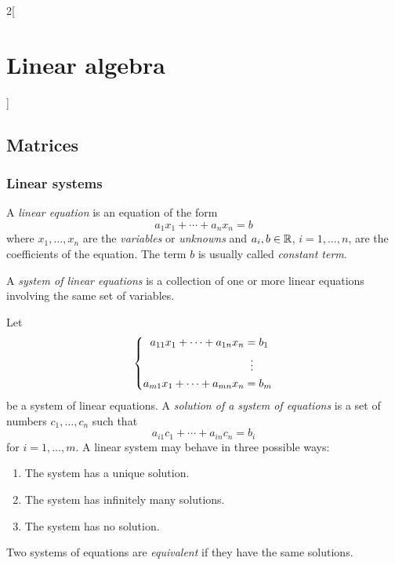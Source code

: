 \documentclass[../../../main_math.tex]{subfiles}
\begin{document}
\renewcommand{\col}{\alg}
\begin{multicols}{2}[\section{Linear algebra}]
  \subsection{Matrices}
  \subsubsection{Linear systems}
  \begin{definition}
    A \emph{linear equation} is an equation of the form $$a_1x_1+\cdots+a_nx_n=b$$ where $x_1,\ldots,x_n$ are the \emph{variables} or \emph{unknowns} and $a_i,b\in\mathbb{R}$, $i=1,\ldots,n$, are the coefficients of the equation. The term $b$ is usually called \emph{constant term}.
  \end{definition}
  \begin{definition}
    A \emph{system of linear equations} is a collection of one or more linear equations involving the same set of variables.
  \end{definition}
  \begin{definition}
    Let
    \begin{equation*}
      \arraycolsep=1pt
      \left\{
      \begin{aligned}
        a_{11}x_1  + \cdots +  a_{1n}x_n & =  b_1     \\
                                         & \;\;\vdots \\
        a_{m1}x_1  + \cdots +  a_{mn}x_n & =  b_m
      \end{aligned}
      \right.
    \end{equation*}
    be a system of linear equations. A \emph{solution of a system of equations} is a set of numbers $c_1,\ldots,c_n$ such that $$a_{i1}c_1+\cdots+a_{in}c_n=b_i$$ for $i=1,\ldots,m$. A linear system may behave in three possible ways:
    \begin{enumerate}
      \item The system has a unique solution.
      \item The system has infinitely many solutions.
      \item The system has no solution.
    \end{enumerate}
  \end{definition}
  \begin{definition}
    Two systems of equations are \emph{equivalent} if they have the same solutions.
  \end{definition}

\end{multicols}
\end{document}
